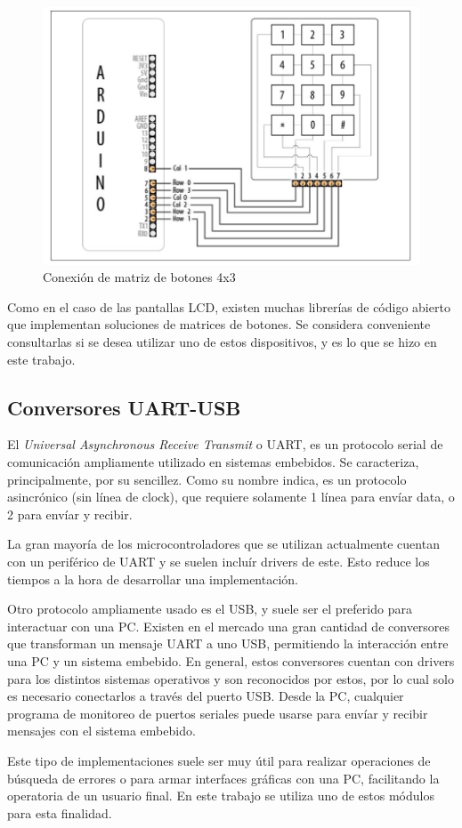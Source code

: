 \begin{figure}[htbp]
	\centering
	\includegraphics[scale=.6]{./Figures/But_Matrix.JPG}
	\caption{Conexión de matriz de botones 4x3\citep{Arduino_Cookbook}}
	\label{fig:but_matrix}
\end{figure}

Como en el caso de las pantallas LCD, existen muchas librerías de código abierto que implementan soluciones de matrices de botones. Se considera conveniente consultarlas si se desea utilizar uno de estos dispositivos, y es lo que se hizo en este trabajo.

\subsection{Conversores UART-USB}

El \textit{Universal Asynchronous Receive Transmit} o UART, es un protocolo serial de comunicación ampliamente utilizado en sistemas embebidos. Se caracteriza, principalmente, por su sencillez. Como su nombre indica, es un protocolo asincrónico (sin línea de clock), que requiere solamente 1 línea para envíar data, o 2 para envíar y recibir.

La gran mayoría de los microcontroladores que se utilizan actualmente cuentan con un periférico de UART y se suelen incluír drivers de este. Esto reduce los tiempos a la hora de desarrollar una implementación.

Otro protocolo ampliamente usado es el USB, y suele ser el preferido para interactuar con una PC. Existen en el mercado una gran cantidad de conversores que transforman un mensaje UART a uno USB, permitiendo la interacción entre una PC y un sistema embebido. En general, estos conversores cuentan con drivers para los distintos sistemas operativos y son reconocidos por estos, por lo cual solo es necesario conectarlos a través del puerto USB. Desde la PC, cualquier programa de monitoreo de puertos seriales puede usarse para envíar y recibir mensajes con el sistema embebido.

Este tipo de implementaciones suele ser muy útil para realizar operaciones de búsqueda de errores o para armar interfaces gráficas con una PC, facilitando la operatoria de un usuario final. En este trabajo se utiliza uno de estos módulos para esta finalidad.

